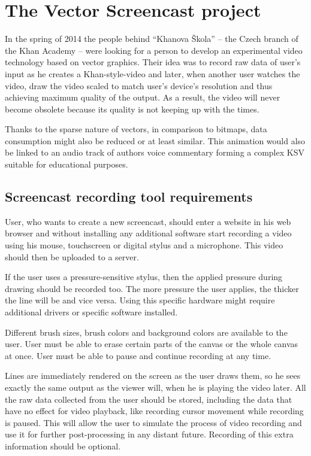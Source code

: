 \chapter{The Vector Screencast project}

In the spring of 2014 the people behind ``Khanova Škola'' -- the Czech branch of the Khan Academy -- were looking for a person to develop an experimental video technology based on vector graphics. Their idea was to record raw data of user's input as he creates a Khan-style-video and later, when another user watches the video, draw the video scaled to match user's device's resolution and thus achieving maximum quality of the output. As a result, the video will never become obsolete because its quality is not keeping up with the times.

Thanks to the sparse nature of vectors, in comparison to bitmaps, data consumption might also be reduced or at least similar. This animation would also be linked to an audio track of authors voice commentary forming a complex KSV suitable for educational purposes.

\section{Screencast recording tool requirements}
User, who wants to create a new screencast, should enter a website in his web browser and without installing any additional software start recording a video using his mouse, touchscreen or digital stylus and a microphone. This video should then be uploaded to a server.

If the user uses a pressure-sensitive stylus, then the applied pressure during drawing should be recorded too. The more pressure the user applies, the thicker the line will be and vice versa. Using this specific hardware might require additional drivers or specific software installed.

Different brush sizes, brush colors and background colors are available to the user. User must be able to erase certain parts of the canvas or the whole canvas at once. User must be able to pause and continue recording at any time.

Lines are immediately rendered on the screen as the user draws them, so he sees exactly the same output as the viewer will, when he is playing the video later. All the raw data collected from the user should be stored, including the data that have no effect for video playback, like recording cursor movement while recording is paused. This will allow the user to simulate the process of video recording and use it for further post-processing in any distant future. Recording of this extra information should be optional.

